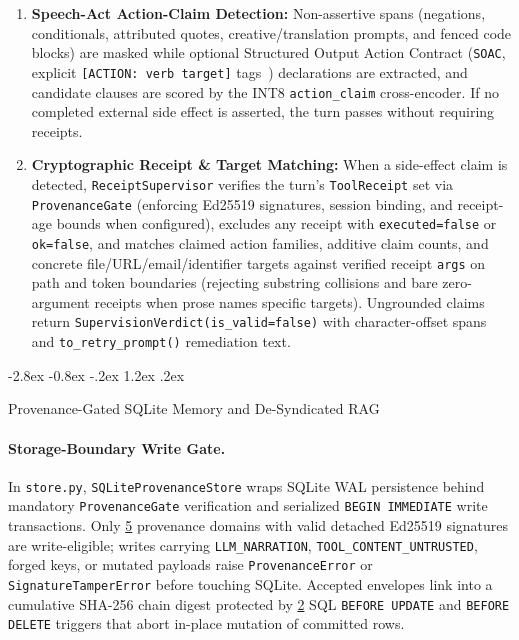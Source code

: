 \documentclass[10pt,twocolumn]{article}
\makeatletter
\renewcommand\subsection{\@startsection{subsection}{2}{\z@}%
  {-2.8ex \@plus -0.8ex \@minus -.2ex}%
  {1.2ex \@plus .2ex}%
  {\normalfont\large\bfseries\raggedright}}
\makeatother
\begin{document}
\begin{enumerate}
  \item \textbf{Speech-Act Action-Claim Detection:} Non-assertive spans (negations, conditionals, attributed quotes, creative/translation prompts, and fenced code blocks) are masked while optional Structured Output Action Contract (\texttt{SOAC}, explicit \texttt{[ACTION: verb target]} tags~\cite{maxwell2026evasion}) declarations are extracted, and candidate clauses are scored by the INT8 \texttt{action\_claim} cross-encoder. If no completed external side effect is asserted, the turn passes without requiring receipts.
  \item \textbf{Cryptographic Receipt \& Target Matching:} When a side-effect claim is detected, \texttt{Receipt\allowbreak Supervisor} verifies the turn's \texttt{Tool\allowbreak Receipt} set via \texttt{Provenance\allowbreak Gate} (enforcing Ed25519 signatures, session binding, and receipt-age bounds when configured), excludes any receipt with \texttt{executed=false} or \texttt{ok=false}, and matches claimed action families, additive claim counts, and concrete file/URL/email/identifier targets against verified receipt \texttt{args} on path and token boundaries (rejecting substring collisions and bare zero-argument receipts when prose names specific targets). Ungrounded claims return \texttt{Supervision\allowbreak Verdict(\allowbreak is\_valid=false)} with character-offset spans and \texttt{to\_\allowbreak retry\_\allowbreak prompt()} remediation text.
\end{enumerate}

\subsection{Provenance-Gated SQLite Memory and De-Syndicated RAG}
\label{sec:memory}

\paragraph{Storage-Boundary Write Gate.}
In \texttt{store.py}, \texttt{SQLite\allowbreak Provenance\allowbreak Store} wraps SQLite WAL persistence behind mandatory \texttt{ProvenanceGate} verification and serialized \texttt{BEGIN IMMEDIATE} write transactions. Only \href{https://github.com/AlienatedAliens/epistemic-guard/blob/v0.5.2/results/table1_architecture.json\#L11}{5} provenance domains with valid detached Ed25519 signatures are write-eligible; writes carrying \texttt{LLM\_NARRATION}, \texttt{TOOL\_\allowbreak CONTENT\_\allowbreak UNTRUSTED}, forged keys, or mutated payloads raise \texttt{ProvenanceError} or \texttt{Signature\allowbreak Tamper\allowbreak Error} before touching SQLite. Accepted envelopes link into a cumulative SHA-256 chain digest protected by \href{https://github.com/AlienatedAliens/epistemic-guard/blob/v0.5.2/results/table2_conformance.json\#L53}{2} SQL \texttt{BEFORE UPDATE} and \texttt{BEFORE DELETE} triggers that abort in-place mutation of committed rows.
\end{document}

